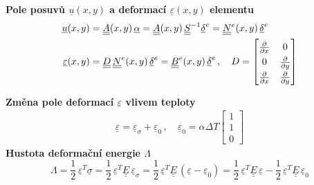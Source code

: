 \documentclass[10pt,oneside]{article}
\newcommand{\tenz}[1]{\vec{\vec{#1}}}
\newcommand{\ul}[1]{\underline{#1}}
\newcommand{\ull}[1]{\underline{\underline{#1}}}
\begin{document}
%
\textbf{Pole posuvů $\ul{u}(x,y)$ a deformací $\ul{\varepsilon}(x,y)$ elementu}
%
\begin{align*}
	\ul{u}(x,y) &= \ull{A}(x,y)\,\ul{\alpha} = \ull{A}(x,y)\,\ull{S}^{-1} \ul{\delta}^e = \ull{N}^e(x,y)\,\ul{\delta}^e\\
	\ul{\varepsilon}(x,y) &= \ull{D}\,\ull{N}^e(x,y)\,\ul{\delta}^e = \ull{B}^e(x,y)\,\ul{\delta}^e
	\,,\quad
	D = \renewcommand\arraystretch{1.3}
	\begin{bmatrix}
	\frac{\partial}{\partial x} & 0 \\
	0 & \frac{\partial}{\partial y} \\
	\frac{\partial}{\partial x} & \frac{\partial}{\partial y}
	\end{bmatrix}
\end{align*}
%

\textbf{Změna pole deformací $\ul{\varepsilon}$ vlivem teploty}
%
\begin{align*}
	\ul{\varepsilon} = \ul{\varepsilon}_\sigma + \ul{\varepsilon}_0 \,,\quad \ul{\varepsilon}_0 = \alpha \Delta T \begin{bmatrix}1\\1\\0\end{bmatrix}
\end{align*}
%
\textbf{Hustota deformační energie $\Lambda$}
\begin{equation*}
	\Lambda = \frac{1}{2}\,\ul{\varepsilon}^T \ul{\sigma}
		= \frac{1}{2}\,\ul{\varepsilon}^T \ull{E}\,\ul{\varepsilon}_\sigma
		= \frac{1}{2}\,\ul{\varepsilon}^T \ull{E}\,(\ul{\varepsilon} - \ul{\varepsilon}_0)
		= \frac{1}{2}\,\ul{\varepsilon}^T \ull{E}\,\ul{\varepsilon} - \frac{1}{2}\,\ul{\varepsilon}^T \ull{E}\,\ul{\varepsilon}_0
\end{equation*}
\end{document}
